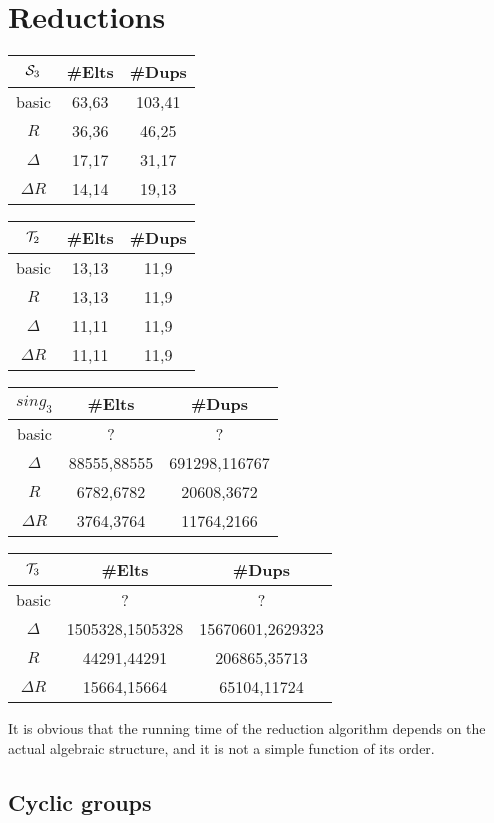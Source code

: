 \documentclass{article}
\theoremstyle{plain}
\theoremstyle{definition}
\newcommand{\cT}{{\cal T}}
\newcommand{\cS}{{\cal S}}
\begin{document}
\section{Reductions}


\begin{tabular}{c|cc}
$\cS_3$ & \#Elts & \#Dups \\
\hline
basic  & 63,63 & 103,41\\
$R$ &36,36 & 46,25\\
$\Delta$ & 17,17 & 31,17 \\
$\Delta R$ & 14,14 & 19,13
\end{tabular}


\begin{tabular}{c|cc}
$\cT_2$ & \#Elts & \#Dups \\
\hline
basic  & 13,13 & 11,9\\
$R$ &13,13 & 11,9\\
$\Delta$ & 11,11 & 11,9 \\
$\Delta R$ & 11,11 & 11,9
\end{tabular}


\begin{tabular}{c|cc}
$sing_3$ & \#Elts & \#Dups \\
\hline
basic  & ? & ?\\
$\Delta$ & 88555,88555 & 691298,116767 \\
$R$ &6782,6782 & 20608,3672\\
$\Delta R$ & 3764,3764 & 11764,2166
\end{tabular}

\begin{tabular}{c|cc}
$\cT_3$ & \#Elts & \#Dups \\
\hline
basic  & ? & ?\\
$\Delta$ & 1505328,1505328 & 15670601,2629323 \\
$R$ & 44291,44291 & 206865,35713\\
$\Delta R$ &15664,15664 & 65104,11724
\end{tabular}



It is obvious that the running time of the reduction algorithm depends on the actual algebraic structure, and it is not a simple function of its  order. 

\subsection{Cyclic groups}
\end{document}
